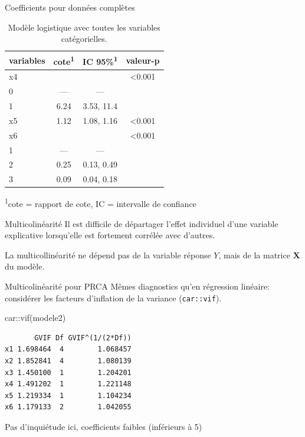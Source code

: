 \documentclass[
  ignorenonframetext,
]{beamer}
\newenvironment{Shaded}{\begin{snugshade}}{\end{snugshade}}
\newcommand{\FunctionTok}[1]{\textcolor[rgb]{0.28,0.35,0.67}{#1}}
\newcommand{\NormalTok}[1]{\textcolor[rgb]{0.00,0.23,0.31}{#1}}
\newcommand{\SpecialCharTok}[1]{\textcolor[rgb]{0.37,0.37,0.37}{#1}}
\begin{document}
\begin{frame}{Coefficients pour données complètes}
\protect\hypertarget{coefficients-pour-donnuxe9es-compluxe8tes-1}{}
\footnotesize

\hypertarget{tbl-logit1-complet2}{}
\setlength{\LTpost}{0mm}
\begin{longtable}{lccc}
\caption{\label{tbl-logit1-complet2}Modèle logistique avec toutes les variables catégorielles. }\tabularnewline

\toprule
variables & cote\textsuperscript{1} & IC 95\%\textsuperscript{1} & valeur-p \\ 
\midrule
x4 &  &  & <0.001 \\ 
0 & — & — &  \\ 
1 & 6.24 & 3.53, 11.4 &  \\ 
x5 & 1.12 & 1.08, 1.16 & <0.001 \\ 
x6 &  &  & <0.001 \\ 
1 & — & — &  \\ 
2 & 0.25 & 0.13, 0.49 &  \\ 
3 & 0.09 & 0.04, 0.18 &  \\ 
\bottomrule
\end{longtable}
\begin{minipage}{\linewidth}
\textsuperscript{1}cote = rapport de cote, IC = intervalle de confiance\\
\end{minipage}
\end{frame}

\begin{frame}{Multicolinéarité}
\protect\hypertarget{multicolinuxe9arituxe9}{}
Il est difficile de départager l'effet individuel d'une variable
explicative lorsqu'elle est fortement corrélée avec d'autres.

La multicollinéarité ne dépend pas de la variable réponse \(Y\), mais de
la matrice \(\mathbf{X}\) du modèle.
\end{frame}

\begin{frame}[fragile]{Multicolinéarité pour PRCA}
\protect\hypertarget{multicolinuxe9arituxe9-pour-prca}{}
Mêmes diagnostics qu'en régression linéaire: considérer les facteurs
d'inflation de la variance (\texttt{car::vif}).

\begin{Shaded}
\begin{Highlighting}[numbers=left,,]
\NormalTok{car}\SpecialCharTok{::}\FunctionTok{vif}\NormalTok{(modele2)}
\end{Highlighting}
\end{Shaded}

\begin{verbatim}
       GVIF Df GVIF^(1/(2*Df))
x1 1.698464  4        1.068457
x2 1.852841  4        1.080139
x3 1.450100  1        1.204201
x4 1.491202  1        1.221148
x5 1.219334  1        1.104234
x6 1.179133  2        1.042055
\end{verbatim}

Pas d'inquiétude ici, coefficients faibles (inférieurs à 5)
\end{frame}
\end{document}
